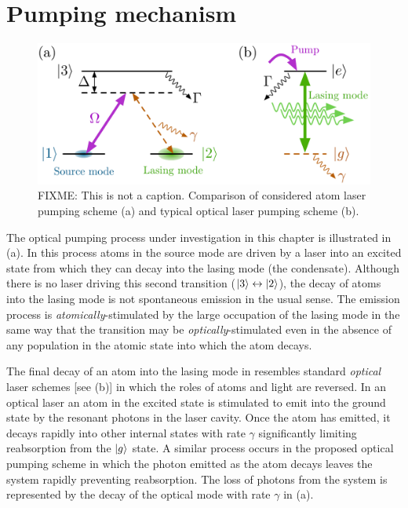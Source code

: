 \section{Pumping mechanism}
\label{OpticalPumping:PumpingMechanism}

\begin{figure}
    \centering
    \includegraphics[width=14cm]{AtomLaserVsOpticalLaser}
    \caption{FIXME: This is not a caption. Comparison of considered atom laser pumping scheme (a) and typical optical laser pumping scheme (b).\label{OpticalPumping:AtomLaserVsOpticalLaser}}
\end{figure}

The optical pumping process under investigation in this chapter is illustrated in (a).  In this process atoms in the source mode are driven by a laser into an excited state from which they can decay into the lasing mode (the condensate).  Although there is no laser driving this second transition (${\left|3\right>}\leftrightarrow{\ensuremath{\left|2\right>}}$), the decay of atoms into the lasing mode is not spontaneous emission in the usual sense.  The emission process is \emph{atomically}-stimulated by the large occupation of the lasing mode in the same way that the transition may be \emph{optically}-stimulated even in the absence of any population in the atomic state into which the atom decays.

The final decay of an atom into the lasing mode in  resembles standard \emph{optical} laser schemes [see (b)] in which the roles of atoms and light are reversed.  In an optical laser an atom in the excited state is stimulated to emit into the ground state by the resonant photons in the laser cavity.  Once the atom has emitted, it decays rapidly into other internal states with rate $\gamma$ significantly limiting reabsorption from the ${\left|g\right>}$ state.  A similar process occurs in the proposed optical pumping scheme in which the photon emitted as the atom decays  leaves the system rapidly preventing reabsorption.  The loss of photons from the system is represented by the decay of the optical mode with rate $\gamma$ in (a).

